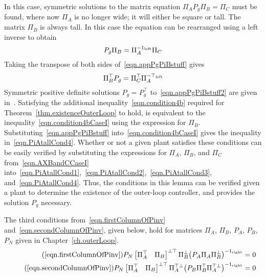 \begin{proof-dan}
  In this case, symmetric solutions to the matrix equation $\Pi_{A}P_{g}\Pi_{B}=\Pi_{C}$ must be found, where now $\Pi_{A}$ is no longer wide; it will either be square or tall.
  The matrix $\Pi_{B}$ is always tall.
  In this case the equation can be rearranged using a left inverse to obtain
  \begin{equation}
    \label{eqn.appPgPiBstuff}
    P_{g}\Pi_{B} = \Pi_{A}^{-1_{\text{\rm{left}}}}\Pi_{C}
  \end{equation}
  Taking the transpose of both sides of\ \eqref{eqn.appPgPiBstuff} gives
  \begin{equation}
    \label{eqn.appPgPiBstuff2}
    \Pi_{B}^{\top}P_{g} = \Pi_{C}^{\top}\Pi_{A}^{-\top_{\text{\rm{left}}}}
  \end{equation}
  Symmetric positive definite solutions $P_{g}=P_{g}^{\top}$ to\ \eqref{eqn.appPgPiBstuff2} are given in\ \cite{hua.symmetric.1990}.
  Satisfying the additional inequality\ \eqref{eqn.condition4b} required for Theorem~\ref{thm.existenceOuterLoop} to hold, is equivalent to the inequality\ \eqref{eqn.condition4bCaseI} using the expression for $\Pi_{B}$.
  Substituting\ \eqref{eqn.appPgPiBstuff} into\ \eqref{eqn.condition4bCaseI} gives the inequality in\ \eqref{eqn.PiAtallCond4}.
  Whether or not a given plant satisfies these conditions can be easily verified by substituting the expressions for $\Pi_{A}$, $\Pi_{B}$, and $\Pi_{C}$ from\ \eqref{eqn.AXBandCCaseI} into\ \eqref{eqn.PiAtallCond1},\ \eqref{eqn.PiAtallCond2},\ \eqref{eqn.PiAtallCond3}, and\ \eqref{eqn.PiAtallCond4}.
  Thus, the conditions in this lemma can be verified given a plant to determine the existence of the outer-loop controller, and provides the solution $P_{g}$ necessary.
\end{proof-dan}

\begin{lem-dan}
  The third conditions from\ \eqref{eqn.firstColumnOfPinv} and\ \eqref{eqn.secondColumnOfPinv}, given below, hold for matrices $\Pi_{A}$, $\Pi_{B}$, $P_{A}$, $P_{B}$, $P_{N}$ given in Chapter~\ref{ch.outerLoop}.
  \begin{align}
    \tag{\ref{eqn.firstColumnOfPinv}}
    P_{N}
    \begin{bmatrix}
      \Pi_{A}^{\top} & \Pi_{B}
    \end{bmatrix}^{\perp\top}
    \Pi_{B}^{\perp}\bigr(P_{A}\Pi_{A}\Pi_{B}^{\perp}\bigr)^{-1_{\text{\rm{right}}}}
    &= 0 \\
    \tag{\ref{eqn.secondColumnOfPinv}}
    P_{N}
    \begin{bmatrix}
      \Pi_{A}^{\top} & \Pi_{B}
    \end{bmatrix}^{\perp\top}
    \Pi_{A}^{\top\perp}\bigr(P_{B}\Pi_{B}^{\top}\Pi_{A}^{\top\perp}\bigr)^{-1_{\text{\rm{right}}}}
    &= 0
  \end{align}
\end{lem-dan}

